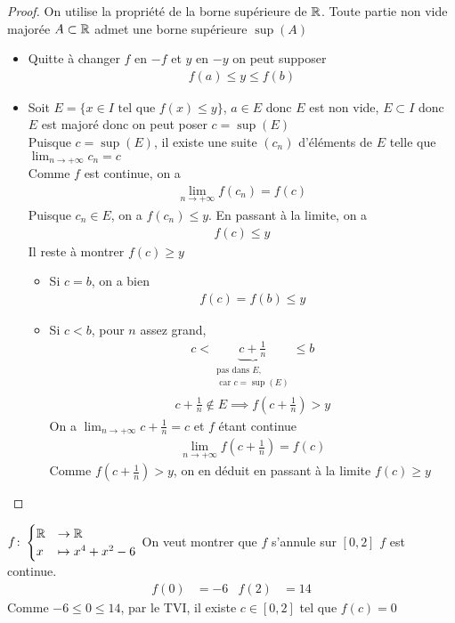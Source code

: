 \begin{proof}
On utilise la propriété de la borne supérieure de $\mathbb{R}$. Toute partie non vide majorée $A \subset \mathbb{R}$ admet une borne supérieure $\sup(A)$
\begin{itemize}
\item Quitte à changer $f$ en $-f$ et $y$ en $-y$ on peut supposer 
\begin{align*}
f(a) \leq y \leq f(b) 
\end{align*}
\item Soit $E = \{x \in I \text{ tel que } f(x) \leq y\}$,
$a \in E$ donc $E$ est non vide,
$E \subset I$ donc $E$ est majoré donc on peut poser $c = \sup(E)$ \\
Puisque $c = \sup(E)$, il existe une suite $(c_n)$ d'éléments de $E$ telle que 
$\lim_{n \to +\infty} c_n = c$ \\
Comme $f$ est continue, on a 
\begin{align*}
\lim_{n \to +\infty} f(c_n) = f(c)
\end{align*}
Puisque $c_n \in E$, on a $f(c_n) \leq y$. En passant à la limite, on a 
\begin{align*}
f(c) \leq y
\end{align*}
Il reste à montrer $f(c) \geq y$
\begin{itemize}
\item Si $c = b$, on a bien 
\begin{align*}
f(c) = f(b) \leq y
\end{align*}
\item Si $c < b$, pour $n$ assez grand, 
\begin{align*}
c < \underbrace{c + \frac{1}{n}}_{\substack{\text{pas dans } E,\\ \text{ car } c= \sup(E)}} \leq b
\end{align*}
\begin{align*}
c + \frac{1}{n} \notin E \implies f\left( c + \frac{1}{n} \right) > y
\end{align*}
On a $\lim_{n \to +\infty} c + \frac{1}{n} = c$ et $f$ étant continue
\begin{align*}
\lim_{n \to +\infty} f\left( c + \frac{1}{n} \right) = f(c)
\end{align*}
Comme $f\left(c + \frac{1}{n}\right) > y$, on en déduit en passant à la limite $f(c) \geq y$
\end{itemize}
\end{itemize}
\end{proof}

\begin{exemple}
$
f \colon 
\begin{cases}
\mathbb{R} &\to \mathbb{R} \\
x &\mapsto x^4 + x^2 - 6
\end{cases}
$
On veut montrer que $f$ s'annule sur $[0,2]$ $f$ est continue.
\\
\begin{align*}
f(0) &= -6 & f(2) &= 14
\end{align*}
Comme $-6 \leq 0 \leq 14$, par le TVI, il existe $c \in [0,2]$ tel que $f(c) = 0$
\end{exemple}

